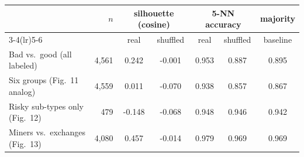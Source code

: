 \begin{tabular}{l r cc cc c}
\toprule
 & $n$ & \multicolumn{2}{c}{silhouette (cosine)} & \multicolumn{2}{c}{5-NN accuracy} & majority\\
\cmidrule(lr){3-4}\cmidrule(lr){5-6}
 & & real & shuffled & real & shuffled & baseline\\
\midrule
Bad vs.\ good (all labeled) & 4,561 & 0.242 & -0.001 & 0.953 & 0.887 & 0.895\\
Six groups (Fig.~11 analog) & 4,559 & 0.011 & -0.070 & 0.938 & 0.857 & 0.867\\
Risky sub-types only (Fig.~12) & 479 & -0.148 & -0.068 & 0.948 & 0.946 & 0.942\\
Miners vs.\ exchanges (Fig.~13) & 4,080 & 0.457 & -0.014 & 0.979 & 0.969 & 0.969\\
\bottomrule
\end{tabular}